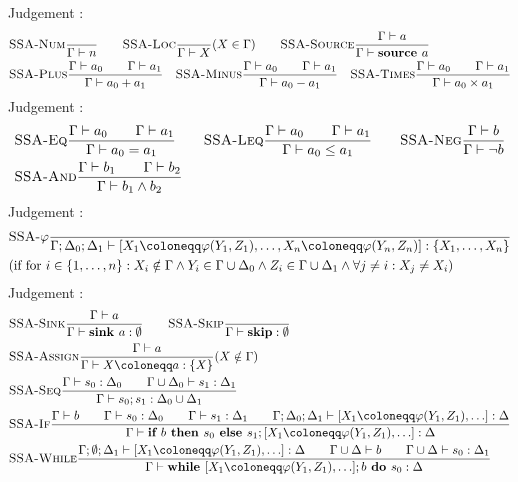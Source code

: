 Judgement :
\begin{align*}
    &\textsc{SSA-Num}\frac{\displaystyle }{\displaystyle \Gamma \vdash {n}}\qquad
    \textsc{SSA-Loc}\frac{\displaystyle }{\displaystyle \Gamma \vdash {X}}\text{($X \in \Gamma$)}\qquad
    \textsc{SSA-Source}\frac{\displaystyle \Gamma \vdash {a}}{\displaystyle \Gamma \vdash {\textbf{source }{a}}}\\
    &\textsc{SSA-Plus}\frac{\displaystyle \Gamma \vdash {a_0}\qquad\Gamma \vdash {a_1}}{\displaystyle \Gamma \vdash {a_0+a_1}}\quad
    \textsc{SSA-Minus}\frac{\displaystyle \Gamma \vdash {a_0}\qquad\Gamma \vdash {a_1}}{\displaystyle \Gamma \vdash {a_0-a_1}}\quad
    \textsc{SSA-Times}\frac{\displaystyle \Gamma \vdash {a_0}\qquad\Gamma \vdash {a_1}}{\displaystyle \Gamma \vdash {a_0 \times a_1}}
\end{align*}
Judgement :
\begin{align*}
    &\textsc{SSA-Eq}\frac{\displaystyle \Gamma \vdash {a_0}\qquad \Gamma \vdash {a_1}}{\displaystyle \Gamma \vdash {a_0 = a_1}}\qquad
    \textsc{SSA-Leq}\frac{\displaystyle \Gamma \vdash {a_0}\qquad \Gamma \vdash {a_1}}{\displaystyle \Gamma \vdash {a_0 \leq a_1}}\qquad
    \textsc{SSA-Neg}\frac{\displaystyle \Gamma \vdash {b}}{\displaystyle \Gamma \vdash {\neg b}}\\
    &\textsc{SSA-And}\frac{\displaystyle \Gamma \vdash {b_1}\qquad\Gamma \vdash {b_2}}{\displaystyle \Gamma \vdash {b_1 \land b_2}}\\
\end{align*}
Judgement :
\begin{align*}
    &\rule{SSA-$\varphi$}{}{\typestep{\Gamma;\Delta_0;\Delta_1}{\defaultphilistn}{\{X_1, \ldots, X_n\}}}\\
    &\text{(if for $i \in \{1, \ldots, n\}: X_i \notin \Gamma \land Y_i \in \Gamma \cup \Delta_0 \land Z_i \in \Gamma \cup \Delta_1
    \land \forall j \neq i: X_j \neq X_i$)}
\end{align*}
Judgement :
\begin{align*}
    &\rule{SSA-Sink}{\typestmt{\Gamma}{a}}{\typestep{\Gamma}{\sink{a}}{\emptyset}}\qquad
    \rule{SSA-Skip}{}{\typestep{\Gamma}{\skipcmd}{\emptyset}}\\
    &\rule{SSA-Assign}{\typestmt{\Gamma}{a}}{\typestep{\Gamma}{\defaultstore}{\{X\}}} \text{($X \notin \Gamma$)}\\
    &\rule{SSA-Seq}{\typestep{\Gamma}{s_0}{\Delta_0}\qquad
    \typestep{\Gamma \cup \Delta_0}{s_1}{\Delta_1}}{\typestep{\Gamma}{\defaultssaseq}{\Delta_0 \cup \Delta_1}}\\
    &\rule{SSA-If}{\typestmt{\Gamma}{b}\qquad\typestep{\Gamma}{s_0}{\Delta_0}\qquad \typestep{\Gamma}{s_1}{\Delta_1}\qquad
    \typestep{\Gamma;\Delta_0;\Delta_1}{\defaultphilist}{\Delta}}
    {\typestep{\Gamma}{\defaultssaif}{\Delta}}\\
    &\rule{SSA-While}{\typestep{\Gamma;\emptyset;\Delta_1}{\defaultphilist}{\Delta}\qquad
    \typestmt{\Gamma \cup \Delta}{b}\qquad\typestep{\Gamma \cup \Delta}{s_0}{\Delta_1}}
    {\typestep{\Gamma}{\defaultssawhile}{\Delta}}
\end{align*}


